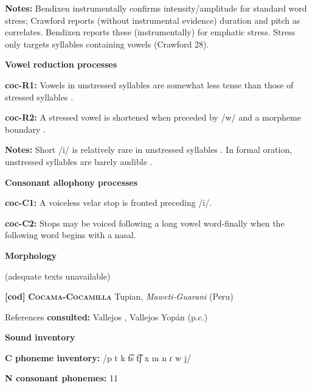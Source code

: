 \textbf{Notes:} Bendixen instrumentally confirms intensity/amplitude for standard word stress; Crawford reports (without instrumental evidence) duration and pitch as correlates. Bendixen reports these (instrumentally) for emphatic stress. Stress only targets syllables containing vowels (Crawford 28).



\textbf{Vowel reduction processes}



\textbf{coc-R1:} Vowels in unstressed syllables are somewhat less tense than those of stressed syllables \citep[22]{Crawford1966}.



\textbf{coc-R2:} A stressed vowel is shortened when preceded by /w/ and a morpheme boundary \citep[67]{Bendixen1980}.



\textbf{Notes:} Short /i/ is relatively rare in unstressed syllables \citep[32]{Crawford1966}. In formal oration, unstressed syllables are barely audible \citep[332-3]{Bendixen1980}.



\textbf{Consonant allophony processes}



\textbf{coc-C1:} A voiceless velar stop is fronted preceding /i/. \citep[15]{Crawford1966}



\textbf{coc-C2:} Stops may be voiced following a long vowel word-finally when the following word begins with a nasal. \citep[99-100]{Bendixen1980}



\textbf{Morphology}



(adequate texts unavailable)



\textbf{[cod]}   \textbf{\textsc{Cocama-Cocamilla}}  Tupian, \textit{Maweti-Guarani} (Peru)



References \textbf{consulted:} Vallejos \citet{Yopán2010}, Vallejos Yopán (p.c.)



\textbf{Sound inventory}



\textbf{C phoneme inventory:} /p t k t͡s t͡ʃ x m n ɾ w j/



\textbf{N consonant phonemes:} 11



